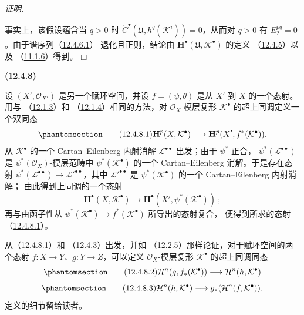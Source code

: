 \documentclass[UTF8,fontset=none,11pt,oneside,openany]{ctexbook}
\providecommand{\square}{\mdlgwhtsquare}
\newenvironment{env}[1][]{%
  \par\medskip\noindent\textbf{(#1)}\ %
}{\par}
\newenvironment{proof}{%
  \par\smallskip\noindent\textit{证明.}\ %
}{\hfill$\square$\par}
\let\EGAOriginalLabel\label
\renewcommand{\label}[1]{\phantomsection\EGAOriginalLabel{#1}}
\begin{document}
\begin{proof}
事实上，该假设蕴含当 $q>0$ 时
$\check C^\bullet(\mathfrak U,h^q(\mathcal K^i))=0$，从而对 $q>0$ 有
$E_2^{pq}=0$。由于谱序列（\hyperref[0.12.4.6.1-fr]{12.4.6.1}）
退化且正则，结论由
$\mathbf H^\bullet(\mathfrak U,\mathcal K^\bullet)$ 的定义
（\hyperref[0.12.4.5-fr]{12.4.5}）以及
（\hyperref[0.11.1.6-fr]{11.1.6}）得到。
\end{proof}

\begin{env}[12.4.8]
\label{0.12.4.8-fr}
设 $(X',\mathcal O_{X'})$ 是另一个赋环空间，并设
$f=(\psi,\theta)$ 是从 $X'$ 到 $X$ 的一个态射。用与
（\hyperref[0.12.1.3-fr]{12.1.3}）和
（\hyperref[0.12.1.4-fr]{12.1.4}）相同的方法，对
$\mathcal O_X$-模层复形 $\mathcal K^\bullet$ 的超上同调定义一个双同态
\begin{equation}
\label{0.12.4.8.1-fr}
\tag{12.4.8.1}
\mathbf H^p(X,\mathcal K^\bullet)
\longrightarrow\mathbf H^p(X',f^*(\mathcal K^\bullet)).
\end{equation}
从 $\mathcal K^\bullet$ 的一个 Cartan--Eilenberg 内射消解
$\mathcal L^{\bullet\bullet}$ 出发；由于 $\psi^*$ 正合，
$\psi^*(\mathcal L^{\bullet\bullet})$ 是
$\psi^*(\mathcal O_X)$-模层范畴中
$\psi^*(\mathcal K^\bullet)$ 的一个 Cartan--Eilenberg 消解。于是存在态射
$\psi^*(\mathcal L^{\bullet\bullet})\to
\mathcal L'^{\bullet\bullet}$，其中 $\mathcal L'^{\bullet\bullet}$ 是
$\psi^*(\mathcal K^\bullet)$ 的一个 Cartan--Eilenberg 内射消解；
\newpage
由此得到上同调的一个态射
\[
\mathbf H^\bullet(X,\mathcal K^\bullet)
\longrightarrow\mathbf H^\bullet(X',\psi^*(\mathcal K^\bullet))~;
\]
再与由函子性从
$\psi^*(\mathcal K^\bullet)\to f^*(\mathcal K^\bullet)$ 所导出的态射复合，
便得到所求的态射（\hyperref[0.12.4.8.1-fr]{12.4.8.1}）。

从（\hyperref[0.12.4.8.1-fr]{12.4.8.1}）和
（\hyperref[0.12.4.3-fr]{12.4.3}）出发，并如
（\hyperref[0.12.2.5-fr]{12.2.5}）那样论证，对于赋环空间的两个态射
$f:X\to Y$、$g:Y\to Z$，可以定义 $\mathcal O_X$-模层复形
$\mathcal K^\bullet$ 的超上同调同态
\begin{equation}
\label{0.12.4.8.2-fr}
\tag{12.4.8.2}
\mathcal H^n(g,f_*(\mathcal K^\bullet))
\longrightarrow\mathcal H^n(h,\mathcal K^\bullet)
\end{equation}
\begin{equation}
\label{0.12.4.8.3-fr}
\tag{12.4.8.3}
\mathcal H^n(h,\mathcal K^\bullet)
\longrightarrow g_*(\mathcal H^n(f,\mathcal K^\bullet)).
\end{equation}
定义的细节留给读者。
\end{env}
\end{document}
